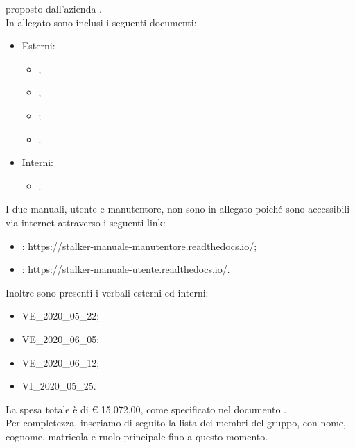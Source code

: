 \documentclass[12pt]{letter}
\begin{document}
\begin{letter}
        proposto dall'azienda \textbf{\Proponente{}}.\\
        In allegato sono inclusi i seguenti documenti:
        \begin{itemize}
            \item Esterni:
            \begin{itemize}
                \item {};
                \item {};
                \item {};
                \item {}.
            \end{itemize}
            \item Interni:
            \begin{itemize}
                \item {}.
            \end{itemize}
        \end{itemize}
        I due manuali, utente e manutentore, non sono in allegato poiché sono accessibili via internet attraverso i seguenti link:
        \begin{itemize}
            \item {}: \href{https://stalker-manuale-manutentore.readthedocs.io/}{https://stalker-manuale-manutentore.readthedocs.io/};
            \item {}: \href{https://stalker-manuale-utente.readthedocs.io/}{https://stalker-manuale-utente.readthedocs.io/}.
        \end{itemize}
        Inoltre sono presenti i verbali esterni ed interni:
        \begin{itemize}
            \item VE\_2020\_05\_22;
            \item VE\_2020\_06\_05;
            \item VE\_2020\_06\_12;
            \item VI\_2020\_05\_25.
        \end{itemize}
        La spesa totale è di \euro{} 15.072,00, come specificato nel documento \PdP{}.\\
        Per completezza, inseriamo di seguito la lista dei membri del gruppo, con nome, cognome, matricola e ruolo principale fino a questo momento.
        {
            \renewcommand{\arraystretch}{1.5}
            \begin{longtable}{ C{4cm} C{3cm} C{6cm} }

\end{longtable}}
\end{letter}
\end{document}
